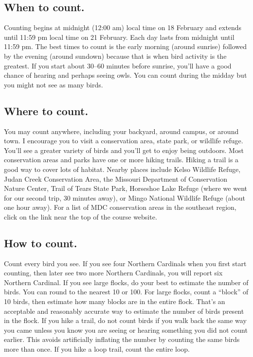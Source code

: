 \documentclass[11pt]{article}
\begin{document}
\subsection*{When to count.}

Counting begins at midnight (12:00 am) local time on 18 February and extends until 11:59 pm local time on 21 February. Each day lasts from midnight until 11:59 pm. The best times to count is the early morning (around sunrise) followed by the evening (around sundown) because that is when bird activity is the greatest. If you start about 30--60 minutes before sunrise, you'll have a good chance of hearing and perhaps seeing owls. You can count during the midday but you might not see as many birds.

\subsection*{Where to count.}

You may count anywhere, including your backyard, around campus, or around town. I encourage you to visit a conservation area, state park, or wildlife refuge. You'll see a greater variety of birds and you'll get to enjoy being outdoors. Most conservation areas and parks have one or more hiking trails. Hiking a trail is a good way to cover lots of habitat.  Nearby places include Kelso Wildlife Refuge, Judan Creek Conservation Area, the Missouri Department of Conservation Nature Center, Trail of Tears State Park, Horseshoe Lake Refuge (where we went for our second trip, 30 minutes away), or Mingo National Wildlife Refuge (about one hour away).  For a list of MDC conservation areas in the southeast region, click on the link near the top of the course website.

\subsection*{How to count.}

Count every bird you see. If you see four Northern Cardinals when you first start counting, then later see two more Northern Cardinals, you will report six Northern Cardinal. If you see large flocks, do your best to estimate the number of birds. You can round to the nearest 10 or 100. For large flocks, count a “block” of 10 birds, then estimate how many blocks are in the entire flock. That's an acceptable and reasonably accurate way to estimate the number of birds present in the flock. If you hike a trail, do not count birds if you walk back the same way you came unless you know you are seeing or hearing something you did not count earlier. This avoids artificially inflating the number by counting the same birds more than once.  If you hike a loop trail, count the entire loop.  
\end{document}
